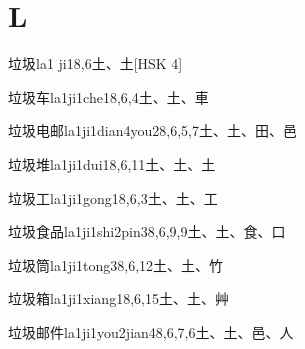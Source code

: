 
\section*{L}

\begin{entry}{垃圾}{la1 ji1}{8,6}{⼟、⼟}[HSK 4]
\end{entry}

\begin{entry}{垃圾车}{la1ji1che1}{8,6,4}{⼟、⼟、⾞}
\end{entry}

\begin{entry}{垃圾电邮}{la1ji1dian4you2}{8,6,5,7}{⼟、⼟、⽥、⾢}
\end{entry}

\begin{entry}{垃圾堆}{la1ji1dui1}{8,6,11}{⼟、⼟、⼟}
\end{entry}

\begin{entry}{垃圾工}{la1ji1gong1}{8,6,3}{⼟、⼟、⼯}
\end{entry}

\begin{entry}{垃圾食品}{la1ji1shi2pin3}{8,6,9,9}{⼟、⼟、⾷、⼝}
\end{entry}

\begin{entry}{垃圾筒}{la1ji1tong3}{8,6,12}{⼟、⼟、⽵}
\end{entry}

\begin{entry}{垃圾箱}{la1ji1xiang1}{8,6,15}{⼟、⼟、⾋}
\end{entry}

\begin{entry}{垃圾邮件}{la1ji1you2jian4}{8,6,7,6}{⼟、⼟、⾢、⼈}
\end{entry}


